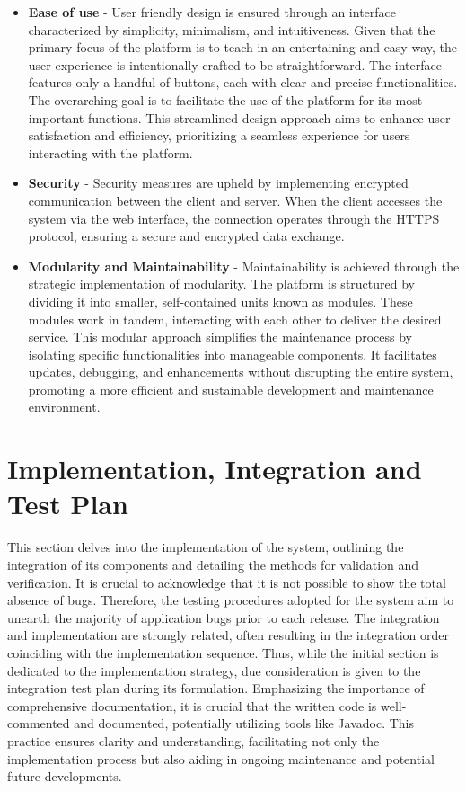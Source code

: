 \documentclass[12pt,oneside,a4paper]{article}
\begin{document}
\begin{itemize}
    \item \textbf{Ease of use} - User friendly design is ensured through an interface characterized by simplicity, minimalism, and intuitiveness. Given that the primary focus of the platform is to teach in an entertaining and easy way, the user experience is intentionally crafted to be straightforward. The interface features only a handful of buttons, each with clear and precise functionalities. The overarching goal is to facilitate the use of the platform for its most important functions. This streamlined design approach aims to enhance user satisfaction and efficiency, prioritizing a seamless experience for users interacting with the platform.
    \item \textbf{Security} - Security measures are upheld by implementing encrypted communication between the client and server. When the client accesses the system via the web interface, the connection operates through the HTTPS protocol, ensuring a secure and encrypted data exchange.
    \item \textbf{Modularity and Maintainability} - Maintainability is achieved through the strategic implementation of modularity. The platform is structured by dividing it into smaller, self-contained units known as modules. These modules work in tandem, interacting with each other to deliver the desired service. This modular approach simplifies the maintenance process by isolating specific functionalities into manageable components. It facilitates updates, debugging, and enhancements without disrupting the entire system, promoting a more efficient and sustainable development and maintenance environment.
\end{itemize}

\pagebreak


\section{Implementation, Integration and Test Plan}
This section delves into the implementation of the system, outlining the integration of its components and detailing the methods for validation and verification. It is crucial to acknowledge that it is not possible to show the total absence of bugs. Therefore, the testing procedures adopted for the system aim to unearth the majority of application bugs prior to each release. The integration and implementation are strongly related, often resulting in the integration order coinciding with the implementation sequence. Thus, while the initial section is dedicated to the implementation strategy, due consideration is given to the integration test plan during its formulation. Emphasizing the importance of comprehensive documentation, it is crucial that the written code is well-commented and documented, potentially utilizing tools like Javadoc. This practice ensures clarity and understanding, facilitating not only the implementation process but also aiding in ongoing maintenance and potential future developments.
\end{document}
